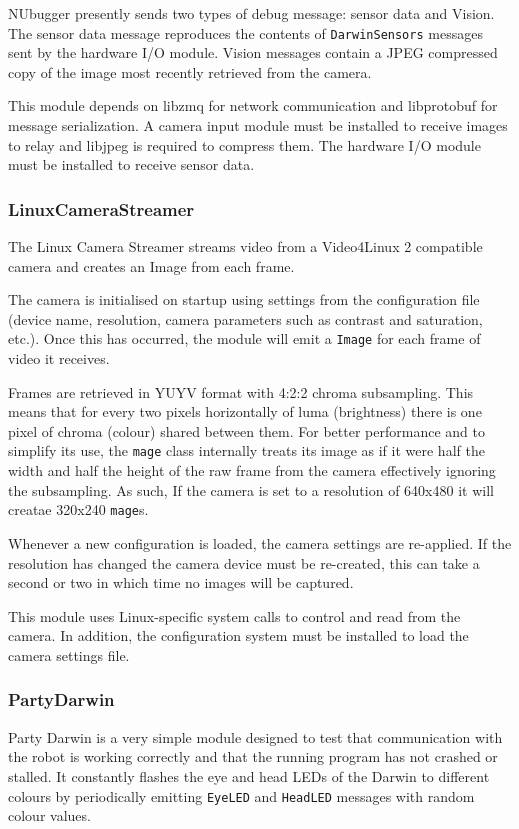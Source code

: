 \documentclass[english,12pt]{scrartcl}
\begin{document}
				NUbugger presently sends two types of debug message: sensor data and Vision.
				The sensor data message reproduces the contents of \texttt{DarwinSensors}
				messages sent by the hardware I/O module. Vision messages contain a JPEG
				compressed copy of the image most recently retrieved from the camera.
				
				This module depends on libzmq for network communication and libprotobuf for
				message serialization. A camera input module must be installed to receive
				images to relay and libjpeg is required to compress them. The hardware I/O
				module must be installed to receive sensor data.
				
				
			\subsubsection{LinuxCameraStreamer}
				The Linux Camera Streamer streams video from a Video4Linux 2 compatible camera and
				creates an Image from each frame.
				
				The camera is initialised on startup using settings from the configuration
				file (device name, resolution, camera parameters such as contrast and
				saturation, etc.). Once this has occurred, the module will emit a
				\texttt{Image} for each frame of video it receives.
				
				Frames are retrieved in YUYV format with 4:2:2 chroma subsampling. This means
				that for every two pixels horizontally of luma (brightness) there is one pixel
				of chroma (colour) shared between them. For better performance and to simplify
				its use, the \texttt{mage} class internally treats its image as if it were half
				the width and half the height of the raw frame from the camera effectively
				ignoring the subsampling. As such, If the camera is set to a resolution of
				640x480 it will creatae 320x240 \texttt{mage}s.
				
				Whenever a new configuration is loaded, the camera settings are re-applied. If
				the resolution has changed the camera device must be re-created, this can take
				a second or two in which time no images will be captured.
				
				This module uses Linux-specific system calls to control and read from the camera.
				In addition, the configuration system must be installed to load the camera settings file.
				
				
			\subsubsection{PartyDarwin}
				Party Darwin is a very simple module designed to test that communication with the
				robot is working correctly and that the running program has not crashed or
				stalled. It constantly flashes the eye and head LEDs of the Darwin to different
				colours by periodically emitting \texttt{EyeLED} and \texttt{HeadLED} messages
				with random colour values.
				
\end{document}
